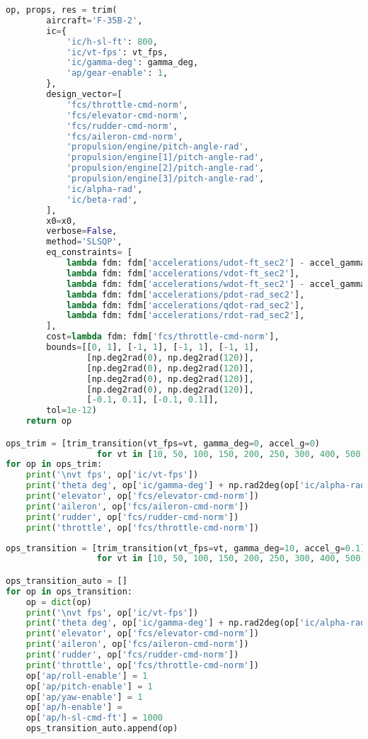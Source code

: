 \begin{lstlisting}[language=Python]
    op, props, res = trim(
        aircraft='F-35B-2',
        ic={
            'ic/h-sl-ft': 800,
            'ic/vt-fps': vt_fps,
            'ic/gamma-deg': gamma_deg,
            'ap/gear-enable': 1,
        },
        design_vector=[
            'fcs/throttle-cmd-norm',
            'fcs/elevator-cmd-norm',
            'fcs/rudder-cmd-norm',
            'fcs/aileron-cmd-norm',
            'propulsion/engine/pitch-angle-rad',
            'propulsion/engine[1]/pitch-angle-rad',
            'propulsion/engine[2]/pitch-angle-rad',
            'propulsion/engine[3]/pitch-angle-rad',
            'ic/alpha-rad',
            'ic/beta-rad',
        ],
        x0=x0,
        verbose=False,
        method='SLSQP',
        eq_constraints= [
            lambda fdm: fdm['accelerations/udot-ft_sec2'] - accel_gamma(fdm, accel_g, gamma_deg)[0],
            lambda fdm: fdm['accelerations/vdot-ft_sec2'],
            lambda fdm: fdm['accelerations/wdot-ft_sec2'] - accel_gamma(fdm, accel_g, gamma_deg)[1],
            lambda fdm: fdm['accelerations/pdot-rad_sec2'],
            lambda fdm: fdm['accelerations/qdot-rad_sec2'],
            lambda fdm: fdm['accelerations/rdot-rad_sec2'],
        ],
        cost=lambda fdm: fdm['fcs/throttle-cmd-norm'],
        bounds=[[0, 1], [-1, 1], [-1, 1], [-1, 1],
                [np.deg2rad(0), np.deg2rad(120)],
                [np.deg2rad(0), np.deg2rad(120)],
                [np.deg2rad(0), np.deg2rad(120)],
                [np.deg2rad(0), np.deg2rad(120)],
                [-0.1, 0.1], [-0.1, 0.1]],
        tol=1e-12)
    return op

ops_trim = [trim_transition(vt_fps=vt, gamma_deg=0, accel_g=0)
                  for vt in [10, 50, 100, 150, 200, 250, 300, 400, 500, 600, 700, 790]]
for op in ops_trim:
    print('\nvt fps', op['ic/vt-fps'])
    print('theta deg', op['ic/gamma-deg'] + np.rad2deg(op['ic/alpha-rad']))
    print('elevator', op['fcs/elevator-cmd-norm'])
    print('aileron', op['fcs/aileron-cmd-norm'])
    print('rudder', op['fcs/rudder-cmd-norm'])
    print('throttle', op['fcs/throttle-cmd-norm'])
\end{lstlisting}

\begin{lstlisting}[language=Python]
ops_transition = [trim_transition(vt_fps=vt, gamma_deg=10, accel_g=0.1)
                  for vt in [10, 50, 100, 150, 200, 250, 300, 400, 500, 600, 650]]

ops_transition_auto = []
for op in ops_transition:
    op = dict(op)
    print('\nvt fps', op['ic/vt-fps'])
    print('theta deg', op['ic/gamma-deg'] + np.rad2deg(op['ic/alpha-rad']))
    print('elevator', op['fcs/elevator-cmd-norm'])
    print('aileron', op['fcs/aileron-cmd-norm'])
    print('rudder', op['fcs/rudder-cmd-norm'])
    print('throttle', op['fcs/throttle-cmd-norm'])
    op['ap/roll-enable'] = 1
    op['ap/pitch-enable'] = 1
    op['ap/yaw-enable'] = 1
    op['ap/h-enable'] = 
    op['ap/h-sl-cmd-ft'] = 1000
    ops_transition_auto.append(op)
\end{lstlisting}

